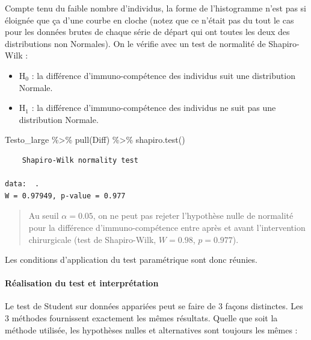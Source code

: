 \documentclass[
  a4paper,
]{article}
\newenvironment{Shaded}{\begin{snugshade}}{\end{snugshade}}
\newcommand{\FunctionTok}[1]{\textcolor[rgb]{0.39,0.29,0.61}{#1}}
\newcommand{\NormalTok}[1]{\textcolor[rgb]{0.12,0.11,0.11}{#1}}
\newcommand{\SpecialCharTok}[1]{\textcolor[rgb]{0.24,0.68,0.91}{#1}}
\providecommand{\tightlist}{%
  \setlength{\itemsep}{0pt}\setlength{\parskip}{0pt}}
\begin{document}
Compte tenu du faible nombre d'individus, la forme de l'histogramme n'est pas si éloignée que ça d'une courbe en cloche (notez que ce n'était pas du tout le cas pour les données brutes de chaque série de départ qui ont toutes les deux des distributions non Normales). On le vérifie avec un test de normalité de Shapiro-Wilk :

\begin{itemize}
\tightlist
\item
  H\(_0\) : la différence d'immuno-compétence des individus suit une distribution Normale.
\item
  H\(_1\) : la différence d'immuno-compétence des individus ne suit pas une distribution Normale.
\end{itemize}

\begin{Shaded}
\begin{Highlighting}[]
\NormalTok{Testo\_large }\SpecialCharTok{\%\textgreater{}\%} 
  \FunctionTok{pull}\NormalTok{(Diff) }\SpecialCharTok{\%\textgreater{}\%} 
  \FunctionTok{shapiro.test}\NormalTok{()}
\end{Highlighting}
\end{Shaded}

\begin{verbatim}
    Shapiro-Wilk normality test

data:  .
W = 0.97949, p-value = 0.977
\end{verbatim}

\begin{quote}
Au seuil \(\alpha = 0.05\), on ne peut pas rejeter l'hypothèse nulle de normalité pour la différence d'immuno-compétence entre après et avant l'intervention chirurgicale (test de Shapiro-Wilk, \(W = 0.98\), \(p = 0.977\)).
\end{quote}

Les conditions d'application du test paramétrique sont donc réunies.

\hypertarget{ruxe9alisation-du-test-et-interpruxe9tation-1}{%
\paragraph{Réalisation du test et interprétation}\label{ruxe9alisation-du-test-et-interpruxe9tation-1}}

Le test de Student sur données appariées peut se faire de 3 façons distinctes. Les 3 méthodes fournissent exactement les mêmes résultats. Quelle que soit la méthode utilisée, les hypothèses nulles et alternatives sont toujours les mêmes :
\end{document}
